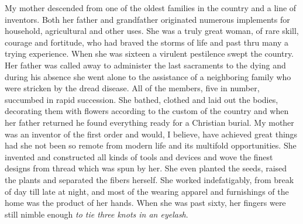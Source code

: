 \documentclass[a4paper,12pt,english,twoside,openright]{memoir}
\begin{document}
	
	My mother descended from one of the oldest families in the country and a line of inventors.  Both 
	her father and grandfather originated numerous implements for household, agricultural and other 
	uses.  She was a truly great woman, of rare skill, courage and fortitude, who had braved the 
	storms of life and past thru many a trying experience.  When she was sixteen a virulent pestilence 
	swept the country.  Her father was called away to administer the last sacraments to the dying and 
	during his absence she went alone to the assistance of a neighboring family who were stricken by 
	the dread disease.  All of the members, five in number, succumbed in rapid succession.  She 
	bathed, clothed and laid out the bodies, decorating them with flowers according to the custom of 
	the country and when her father returned he found everything ready for a Christian burial.  My 
	mother was an inventor of the first order and would, I believe, have achieved great things had she 
	not been so remote from modern life and its multifold opportunities.  She invented and 
	constructed all kinds of tools and devices and wove the finest designs from thread which was 
	spun by her.  She even planted the seeds, raised the plants and separated the fibers herself.  
	She worked indefatigably, from break of day till late at night, and most of the wearing apparel and 
	furnishings of the home was the product of her hands.  When she was past sixty, her fingers were 
	still nimble enough \emph{to tie three knots in an eyelash}.  
	
\end{document}
